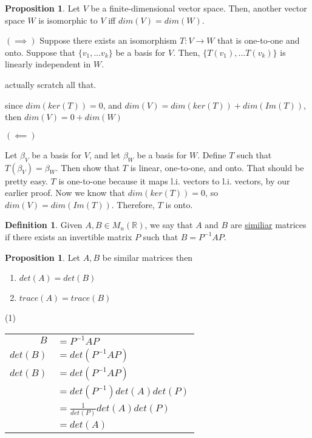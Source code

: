 \documentclass[a5paper]{article}
\makeatletter
\renewenvironment{proof}{{\bfseries Proof}}{\qed}
\renewenvironment{proof}[1][\bfseries \proofname]{\par
  \pushQED{\qed}%
  \normalfont \topsep6\p@\@plus6\p@\relax
  \trivlist
  \item[\hskip\labelsep
        \scshape
    #1\@addpunct{}]\ignorespaces
}{%
  \popQED\endtrivlist\@endpefalse
}
\theoremstyle{definition}%
\numberwithin{theorem}{section} %
\newtheorem{definition}[theorem]{Definition}
\newtheorem{proposition}[theorem]{Proposition}
\newcommand{\R}{\mathbb{R}}
\makeatother
\begin{document}
\begin{proposition}
Let $V$ be a finite-dimensional vector space. Then, another vector space $W$ is isomorphic to $V$ iff $dim(V) = dim(W)$. 

\begin{proof}
$(\implies)$ Suppose there exists an isomorphism $T: V \to W$ that is one-to-one and onto. Suppose that $\{v_1, ... v_k\}$ be a basis for $V$. Then, $\{T(v_1), ... T(v_k)\}$ is linearly independent in $W$. 

actually scratch all that. 

since $dim(ker(T)) = 0$, and $dim(V) = dim(ker(T)) + dim(Im(T))$, then $dim(V) = 0 + dim(W)$
\end{proof}

\begin{proof}
$(\impliedby)$

Let $\beta_V$ be a basis for $V$, and let $\beta_W$ be a basis for $W$. Define $T$ such that $T(\beta_V) = \beta_W$. Then show that $T$ is linear, one-to-one, and onto. That should be pretty easy. $T$ is one-to-one because it maps l.i. vectors to l.i. vectors, by our earlier proof. Now we know that $dim(ker(T)) = 0$, so $dim(V) = dim(Im(T))$. Therefore, $T$ is onto. 
\end{proof}
\end{proposition}

\begin{definition}
Given $A,B \in M_n(\R)$, we say that $A$ and $B$ are \underline{similiar} matrices if there exists an invertible matrix $P$ such that $B=P^{-1}AP$. 
\end{definition}

\begin{proposition}
Let $A,B$ be similar matrices then
\begin{enumerate}
\item $det(A) = det(B)$
\item $trace(A) = trace(B)$
\end{enumerate}
\begin{proof}
(1) 

\begin{tabular}{rl}
$B $&$= P^{-1}AP$ \\ 
$det(B) $&$= det(P^{-1}AP)$ \\ 
$det(B) $&$= det(P^{-1}AP)$ \\ 
&$= det(P^{-1})det(A)det(P)$\\
&$= \frac{1}{det(P)}det(A)det(P)$\\
&$= det(A)$\\
\end{tabular}

\end{proof}
\end{proposition}
\end{document}
